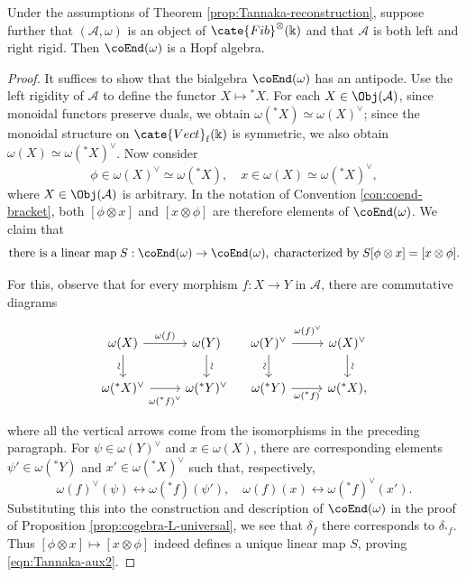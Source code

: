 \begin{theorem}\label{prop:Tannaka-aux2}
	Under the assumptions of Theorem \ref{prop:Tannaka-reconstruction},
	suppose further that $(\mathcal{A}, \omega)$ is an object of
	$\cate{Fib}^{\otimes}(\Bbbk)$ and that $\mathcal{A}$ is both left and
	right rigid. Then $\coEnd(\omega)$ is a Hopf algebra.
\end{theorem}
\begin{proof}
	It suffices to show that the bialgebra $\coEnd(\omega)$ has an antipode.
	Use the left rigidity of $\mathcal{A}$ to define the functor
	$X \mapsto {}^* X$. For each $X \in \Obj(\mathcal{A})$, since monoidal
	functors preserve duals, we obtain
	$\omega({}^* X) \simeq \omega(X)^\vee$; since the monoidal structure on
	$\cate{Vect}_{\mathrm{f}}(\Bbbk)$ is symmetric, we also obtain
	$\omega(X) \simeq \omega({}^* X)^\vee$. Now consider
	\[ \phi \in \omega(X)^\vee \simeq \omega({}^* X), \quad x \in \omega(X) \simeq \omega({}^* X)^\vee , \]
	where $X \in \Obj(\mathcal{A})$ is arbitrary. In the notation of
	Convention \ref{con:coend-bracket}, both $[\phi \otimes x]$ and
	$[x \otimes \phi]$ are therefore elements of $\coEnd(\omega)$. We claim
	that
	\begin{equation}\label{eqn:Tannaka-aux2}
		\text{there is a linear map}\; S: \coEnd(\omega) \to \coEnd(\omega), \;\text{characterized by}\; S[\phi \otimes x] = [x \otimes \phi]. 
	\end{equation}

	For this, observe that for every morphism $f: X \to Y$ in
	$\mathcal{A}$, there are commutative diagrams
	\[\begin{tikzcd}
		\omega(X) \arrow[r, "{\omega(f)}"] \arrow[d, "\sim"' sloped] & \omega(Y) \arrow[d, "\sim" sloped] \\
		\omega({}^* X)^\vee \arrow[r, "{\omega({}^* f)^\vee}"' inner sep=0.6em] & \omega({}^* Y)^\vee
	\end{tikzcd} \quad \begin{tikzcd}
		\omega(Y)^\vee \arrow[r, "{\omega(f)^\vee}" inner sep=0.6em] \arrow[d, "\sim"' sloped] & \omega(X)^\vee \arrow[d, "\sim" sloped] \\
		\omega({}^* Y) \arrow[r, "{\omega({}^* f)}"'] & \omega({}^* X),
	\end{tikzcd}\]
	where all the vertical arrows come from the isomorphisms in the preceding
	paragraph. For $\psi \in \omega(Y)^\vee$ and $x \in \omega(X)$, there
	are corresponding elements $\psi' \in \omega({}^* Y)$ and
	$x' \in \omega({}^* X)^\vee$ such that, respectively,
	\[ \omega(f)^\vee (\psi) \leftrightarrow \omega({}^* f)(\psi'), \quad \omega(f)(x) \leftrightarrow \omega({}^* f)^\vee(x'). \]
	Substituting this into the construction and description of
	$\coEnd(\omega)$ in the proof of Proposition
	\ref{prop:cogebra-L-universal}, we see that $\delta_f$ there corresponds
	to $\delta_{{}^* f}$. Thus
	$[\phi \otimes x] \mapsto [x \otimes \phi]$ indeed defines a unique
	linear map $S$, proving \eqref{eqn:Tannaka-aux2}.
	

\end{proof}

